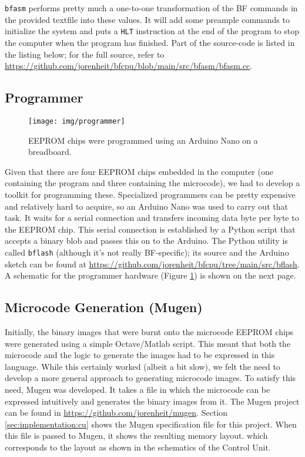 \texttt{bfasm} performs pretty much a one-to-one transformation of the BF commands in the provided textfile into these values. It will add some preample commands to initialize the system and puts a \texttt{HLT} instruction at the end of the program to stop the computer when the program has finished. Part of the source-code is listed in the listing below; for the full source, refer to \url{https://github.com/jorenheit/bfcpu/blob/main/src/bfasm/bfasm.cc}.



\subsection{Programmer}

\begin{figure}[H]
  \centering
  \texttt{[image: img/programmer]}
  \caption{EEPROM chips were programmed using an Arduino Nano on a breadboard.}
  \label{fig:programmer}
\end{figure}

Given that there are four EEPROM chips embedded in the computer (one containing the program and three containing the microcode), we had to develop a toolkit for programming these. Specialized programmers can be pretty expensive and relatively hard to acquire, so an Arduino Nano was used to carry out that task. It waits for a serial connection and transfers incoming data byte per byte to the EEPROM chip. This serial connection is established by a Python script that accepts a binary blob and passes this on to the Arduino. The Python utility is called \texttt{bflash} (although it's not really BF-specific); its source and the Arduino sketch can be found at \url{https://github.com/jorenheit/bfcpu/tree/main/src/bflash}. A schematic for the programmer hardware (Figure \ref{fig:programmer}) is shown on the next page.



\subsection{Microcode Generation (Mugen)}
Initially, the binary images that were burnt onto the microcode EEPROM chips were generated using a simple Octave/Matlab script. This meant that both the microcode and the logic to generate the images had to be expressed in this language. While this certainly worked (albeit a bit slow), we felt the need to develop a more general approach to generating microcode images. To satisfy this need, Mugen was developed. It takes a file in which the microcode can be expressed intuitively and generates the binary images from it. The Mugen project can be found in \url{https://github.com/jorenheit/mugen}. Section \ref{sec:implementation:cu} shows the Mugen specification file for this project. When this file is passed to Mugen, it shows the resulting memory layout. which corresponds to the layout as shown in the schematics of the Control Unit.


